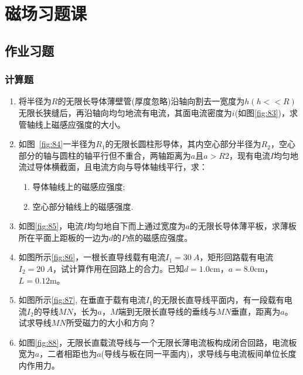 \chapter{磁场习题课}
\section{作业习题}
\subsection*{计算题}
\begin{enumerate}
    \item 将半径为$R$的无限长导体薄壁管(厚度忽略)沿轴向割去一宽度为$h(h<<R)$无限长狭缝后，再沿轴向均匀地流有电流，其面电流密度为$i$(如图\ref{fig:83})，求管轴线上磁感应强度的大小。
    \item 如图~\ref{fig:84}一半径为$R_1$的无限长圆柱形导体，其内空心部分半径为$R_2$，空心部分的轴与圆柱的轴平行但不重合，两轴距离为$a$且$a>R2$，现有电流$I$均匀地流过导体横截面，且电流方向与导体轴线平行，求：
    \begin{enumerate}[label=\arabic*]
        \item 导体轴线上的磁感应强度;
        \item 空心部分轴线上的磁感强度.
    \end{enumerate}
    \item 如图\ref{fig:85}，电流$I$均匀地自下而上通过宽度为$a$的无限长导体薄平板，求薄板所在平面上距板的一边为$d$的$P$点的磁感应强度。
    \item 如图所示\ref{fig:86}，一根长直导线载有电流$I_1=30~A$，矩形回路载有电流$I_2=20~A$，试计算作用在回路上的合力。已知$d=1.0$cm，$a=8.0$cm，$L=0.12$m。
    \item 如图所示\ref{fig:87}, 在垂直于载有电流$I_1$的无限长直导线平面内，有一段载有电流$I_2$的导线$MN$，长为$a$，$M$端到无限长直导线的垂线与$MN$垂直，距离为$a$。试求导线$MN$所受磁力的大小和方向？
    \item 如图\ref{fig:88}，无限长直载流导线与一个无限长薄电流板构成闭合回路，电流板宽为$a$，二者相距也为$a$(导线与板在同一平面内)，求导线与电流板间单位长度内作用力。
\end{enumerate}